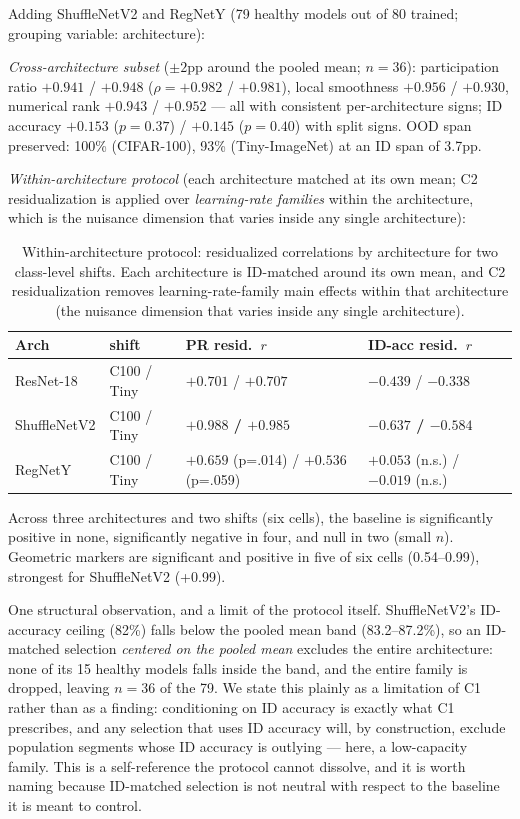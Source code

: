 \documentclass[10pt]{article} %
\begin{document}
Adding ShuffleNetV2 and RegNetY (79 healthy models out of 80 trained; grouping variable: architecture):

\emph{Cross-architecture subset} ($\pm2$pp around the pooled mean; $n=36$): participation ratio $+0.941$ / $+0.948$ ($\rho=+0.982$ / $+0.981$), local smoothness $+0.956$ / $+0.930$, numerical rank $+0.943$ / $+0.952$ --- all with consistent per-architecture signs; ID accuracy $+0.153$ ($p=0.37$) / $+0.145$ ($p=0.40$) with split signs. OOD span preserved: 100\% (CIFAR-100), 93\% (Tiny-ImageNet) at an ID span of 3.7pp.

\emph{Within-architecture protocol} (each architecture matched at its own mean; C2 residualization is applied over \emph{learning-rate families} within the architecture, which is the nuisance dimension that varies inside any single architecture):

\begin{table}[t]
\caption{Within-architecture protocol: residualized correlations by architecture for two class-level shifts. Each architecture is ID-matched around its own mean, and C2 residualization removes learning-rate-family main effects within that architecture (the nuisance dimension that varies inside any single architecture).}
\label{tab:withinarch}
\centering
\small
\setlength{\tabcolsep}{6pt}
\begin{tabular}{@{}p{2.8cm}p{2.6cm}p{4.4cm}p{4.4cm}@{}}
\hline
Arch & shift & PR resid.\ $r$ & ID-acc resid.\ $r$ \\
\hline
ResNet-18 & C100 / Tiny & $+0.701$ / $+0.707$ & $-0.439$ / $-0.338$ \\
\hline
ShuffleNetV2 & C100 / Tiny & \textbf{$+0.988$ / $+0.985$} & \textbf{$-0.637$ / $-0.584$} \\
\hline
RegNetY & C100 / Tiny & $+0.659$ (p=.014) / $+0.536$ (p=.059) & $+0.053$ (n.s.) / $-0.019$ (n.s.) \\
\hline
\end{tabular}
\end{table}

Across three architectures and two shifts (six cells), the baseline is significantly positive in none, significantly negative in four, and null in two (small $n$). Geometric markers are significant and positive in five of six cells (0.54--0.99), strongest for ShuffleNetV2 (+0.99).

One structural observation, and a limit of the protocol itself. ShuffleNetV2's ID-accuracy ceiling (82\%) falls below the pooled mean band (83.2--87.2\%), so an ID-matched selection \emph{centered on the pooled mean} excludes the entire architecture: none of its 15 healthy models falls inside the band, and the entire family is dropped, leaving $n=36$ of the 79. We state this plainly as a limitation of C1 rather than as a finding: conditioning on ID accuracy is exactly what C1 prescribes, and any selection that uses ID accuracy will, by construction, exclude population segments whose ID accuracy is outlying --- here, a low-capacity family. This is a self-reference the protocol cannot dissolve, and it is worth naming because ID-matched selection is not neutral with respect to the baseline it is meant to control.
\end{document}
